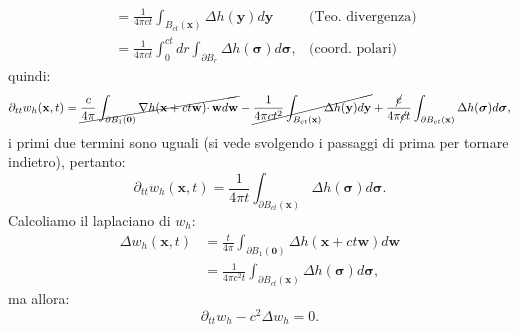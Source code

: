\documentclass[10pt,a4paper,twoside,openright]{book}
\newcommand{\x}{\mathbf{x}}
\newcommand{\y}{\mathbf{y}}
\newcommand{\zer}{\mathbf{0}}
\begin{document}
\begin{dimostrazione}
\begin{align*}
	 	& =\frac{1}{4\pi ct}\int _{B_{ct}(\x)} \Delta h(\y) d\y & \text{(Teo. divergenza)}\\
	 	& =\frac{1}{4\pi ct}\int _{0}^{ct} dr\int _{\partial B_{r}} \Delta h(\bm{\sigma}) d\bm{\sigma} , & \text{(coord. polari)}
	\end{align*}
	quindi:
	\begin{equation*}
		\partial _{tt} w_{h}(\x ,t) =\cancel{\frac{c}{4\pi }\int _{\partial B_{1}(\zer)} \nabla h(\x +ct\mathbf{w}) \cdotp \mathbf{w} d\mathbf{w}} -\cancel{\frac{1}{4\pi ct^{2}}\int _{B_{ct}(\x)} \Delta h(\y) d\y} +\frac{\cancel{c}}{4\pi \cancel{c} t}\int _{\partial B_{ct}(\x)} \Delta h(\bm{\sigma}) d\bm{\sigma} ,
	\end{equation*}
	i primi due termini sono uguali (si vede svolgendo i passaggi di prima per tornare indietro), pertanto:
	\begin{equation*}
		\partial _{tt} w_{h}(\x ,t) =\frac{1}{4\pi t}\int _{\partial B_{ct}(\x)} \Delta h(\bm{\sigma}) d\bm{\sigma} .
	\end{equation*}
	Calcoliamo il laplaciano di $\displaystyle w_{h}$:
	\begin{align*}
		\Delta w_{h}(\x ,t) & =\frac{t}{4\pi }\int _{\partial B_{1}(\zer)} \Delta h(\x +ct\mathbf{w}) d\mathbf{w} \\
		                            & =\frac{1}{4\pi c^{2} t}\int _{\partial B_{ct}(\x)} \Delta h(\bm{\sigma }) d\bm{\sigma } , 
	\end{align*}
	ma allora:
	\begin{equation*}
		\partial _{tt} w_{h} -c^{2} \Delta w_{h} =0.
	\end{equation*}
\end{dimostrazione}
\end{document}
